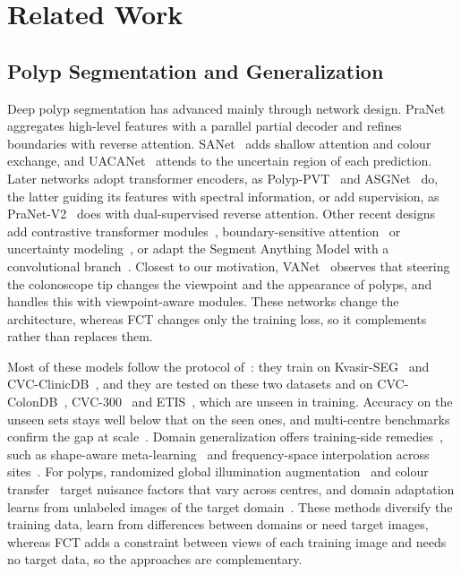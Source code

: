 \section{Related Work}
\label{sec:related}

\subsection{Polyp Segmentation and Generalization}

Deep polyp segmentation has advanced mainly through network design.
PraNet~\cite{fan2020pranet} aggregates high-level features with a parallel partial decoder and
refines boundaries with reverse attention. SANet~\cite{wei2021sanet} adds shallow attention and
colour exchange, and UACANet~\cite{kim2021uacanet} attends to the uncertain region of each
prediction. Later networks adopt transformer encoders, as Polyp-PVT~\cite{dong2023polyppvt} and
ASGNet~\cite{sun2026asgnet} do, the latter guiding its features with spectral information, or
add supervision, as PraNet-V2~\cite{hu2026pranetv2} does with dual-supervised reverse attention.
Other recent designs add contrastive transformer modules~\cite{xiao2024ctnet}, boundary-sensitive
attention~\cite{shao2024polyper} or uncertainty modeling~\cite{du2025umnet}, or adapt the Segment
Anything Model with a convolutional branch~\cite{li2024asps}. Closest to our motivation,
VANet~\cite{cai2024vanet} observes that steering the colonoscope tip changes the viewpoint and the
appearance of polyps, and handles this with viewpoint-aware modules. These networks change the
architecture, whereas FCT changes only the training loss, so it complements rather than replaces
them.

Most of these models follow the protocol of~\cite{fan2020pranet}: they train on
Kvasir-SEG~\cite{jha2020kvasir} and CVC-ClinicDB~\cite{bernal2015clinicdb}, and they are tested
on these two datasets and on CVC-ColonDB~\cite{tajbakhsh2016colondb},
CVC-300~\cite{vazquez2017endoscene} and ETIS~\cite{silva2014etis}, which are unseen in training.
Accuracy on the unseen sets stays well below that on the seen ones, and multi-centre benchmarks
confirm the gap at scale~\cite{ali2023polypgen,ali2024endocv}. Domain generalization offers
training-side remedies~\cite{zhou2023dgsurvey}, such as shape-aware
meta-learning~\cite{liu2020saml} and frequency-space interpolation across
sites~\cite{liu2021feddg}. For polyps, randomized global illumination
augmentation~\cite{zhang2024illumination} and colour transfer~\cite{du2025umnet} target nuisance
factors that vary across centres, and domain adaptation learns from unlabeled images of the target
domain~\cite{lu2025dclps}. These methods diversify the training data, learn from differences
between domains or need target images, whereas FCT adds a constraint between views of each training
image and needs no target data, so the approaches are complementary.


